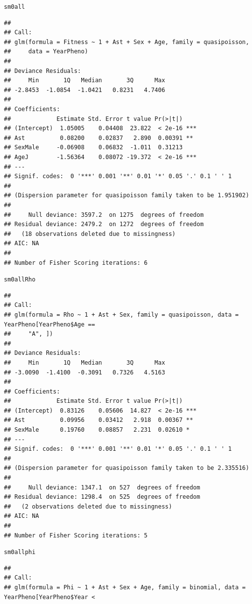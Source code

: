 \documentclass{article}\usepackage[]{graphicx}\usepackage[]{color}
\makeatletter
\newcommand{\hlstd}[1]{\textcolor[rgb]{0.345,0.345,0.345}{#1}}%
\newenvironment{kframe}{%
 \def\at@end@of@kframe{}%
 \ifinner\ifhmode%
  \def\at@end@of@kframe{\end{minipage}}%
  \begin{minipage}{\columnwidth}%
 \fi\fi%
 \def\FrameCommand##1{\hskip\@totalleftmargin \hskip-\fboxsep
 \colorbox{shadecolor}{##1}\hskip-\fboxsep
     \hskip-\linewidth \hskip-\@totalleftmargin \hskip\columnwidth}%
 \MakeFramed {\advance\hsize-\width
   \@totalleftmargin\z@ \linewidth\hsize
   \@setminipage}}%
 {\par\unskip\endMakeFramed%
 \at@end@of@kframe}
\newenvironment{knitrout}{}{} %
\makeatother
\begin{document}
\begin{knitrout}
\begin{kframe}
{\ttfamily\noindent\bfseries\color{errorcolor}{\#\# Error in mean(SeSelByYear): objet 'SeSelByYear' introuvable}}\begin{alltt}
\hlstd{sm0all}
\end{alltt}
\begin{verbatim}
## 
## Call:
## glm(formula = Fitness ~ 1 + Ast + Sex + Age, family = quasipoisson, 
##     data = YearPheno)
## 
## Deviance Residuals: 
##     Min       1Q   Median       3Q      Max  
## -2.8453  -1.0854  -1.0421   0.8231   4.7406  
## 
## Coefficients:
##             Estimate Std. Error t value Pr(>|t|)    
## (Intercept)  1.05005    0.04408  23.822  < 2e-16 ***
## Ast          0.08200    0.02837   2.890  0.00391 ** 
## SexMale     -0.06908    0.06832  -1.011  0.31213    
## AgeJ        -1.56364    0.08072 -19.372  < 2e-16 ***
## ---
## Signif. codes:  0 '***' 0.001 '**' 0.01 '*' 0.05 '.' 0.1 ' ' 1
## 
## (Dispersion parameter for quasipoisson family taken to be 1.951902)
## 
##     Null deviance: 3597.2  on 1275  degrees of freedom
## Residual deviance: 2479.2  on 1272  degrees of freedom
##   (18 observations deleted due to missingness)
## AIC: NA
## 
## Number of Fisher Scoring iterations: 6
\end{verbatim}
\begin{alltt}
\hlstd{sm0allRho}
\end{alltt}
\begin{verbatim}
## 
## Call:
## glm(formula = Rho ~ 1 + Ast + Sex, family = quasipoisson, data = YearPheno[YearPheno$Age == 
##     "A", ])
## 
## Deviance Residuals: 
##     Min       1Q   Median       3Q      Max  
## -3.0090  -1.4100  -0.3091   0.7326   4.5163  
## 
## Coefficients:
##             Estimate Std. Error t value Pr(>|t|)    
## (Intercept)  0.83126    0.05606  14.827  < 2e-16 ***
## Ast          0.09956    0.03412   2.918  0.00367 ** 
## SexMale      0.19760    0.08857   2.231  0.02610 *  
## ---
## Signif. codes:  0 '***' 0.001 '**' 0.01 '*' 0.05 '.' 0.1 ' ' 1
## 
## (Dispersion parameter for quasipoisson family taken to be 2.335516)
## 
##     Null deviance: 1347.1  on 527  degrees of freedom
## Residual deviance: 1298.4  on 525  degrees of freedom
##   (2 observations deleted due to missingness)
## AIC: NA
## 
## Number of Fisher Scoring iterations: 5
\end{verbatim}
\begin{alltt}
\hlstd{sm0allphi}
\end{alltt}
\begin{verbatim}
## 
## Call:
## glm(formula = Phi ~ 1 + Ast + Sex + Age, family = binomial, data = YearPheno[YearPheno$Year < 

\end{verbatim}
\end{kframe}
\end{knitrout}
\end{document}
